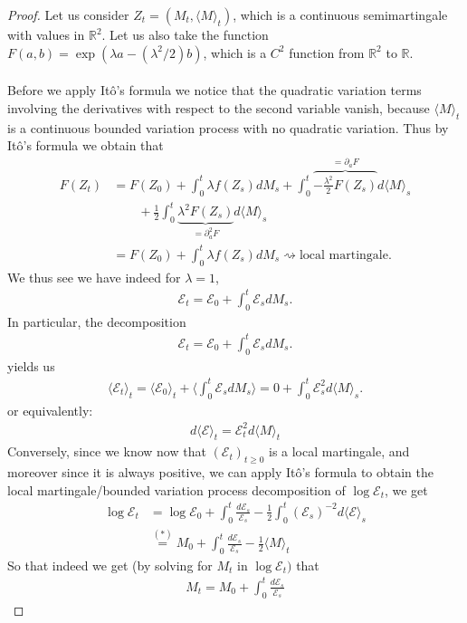 \documentclass[../mainfile.tex]{subfiles}
\begin{document}
\begin{proof}
Let us consider $Z_t= ( M_t, \langle M \rangle_t)$, which is a continuous semimartingale with values in $\mathbb{R}^2$. Let us also take the function $F(a,b)= \exp( \lambda a - (\lambda^2/2)b)$, which is a $C^2$ function from $\mathbb{R}^2$ to $ \mathbb{R}$.
\\
\\
Before we apply Itô's formula we notice that the quadratic variation terms involving the derivatives with respect to the second variable vanish, because $\langle M \rangle_t$ is a continuous bounded variation process with no quadratic variation. Thus by Itô's formula we obtain that
\begin{align*}
F(Z_t)&= F(Z_0) + \int_0^t \lambda f(Z_s)dM_s + \int_0^t \overbrace{- \frac{\lambda^2}{2}F(Z_s)}^{= \partial_a F}d \langle M \rangle _s \\
& \qquad + \frac{1}{2} \int_0^t  \underbrace{\lambda^2 F(Z_s)}_{= \partial^2_a F} d \langle M \rangle_s \\
&= F(Z_0) +  \int_0^t \lambda f(Z_s)dM_s \rightsquigarrow \text{local martingale}.
\end{align*}
We thus see we have indeed for $\lambda=1$,
\begin{align*}
\mathcal{E}_t= \mathcal{E}_0 + \int_0^t \mathcal{E}_s dM_s.
\end{align*}
\newpage
In particular, the decomposition 
\begin{align*}
\mathcal{E}_t= \mathcal{E}_0 + \int_0^t \mathcal{E}_s dM_s.
\end{align*}
yields us
\begin{align*}
\langle \mathcal{E}_t \rangle_t = \langle \mathcal{E}_0 \rangle_t + \langle \int_0^t \mathcal{E}_s d M_s \rangle = 0 + \int_0^t \mathcal{E}_s^2 d\langle M\rangle_s.
\end{align*}
or equivalently:
\begin{align*}
d \langle \mathcal{E} \rangle_t = \mathcal{E}_t^2 d\langle M\rangle_t \tag{*}
\end{align*}
Conversely, since we know now that $(\mathcal{E}_t)_{t \geq 0}$ is a local martingale, and moreover since it is always positive, we can apply Itô's formula to obtain the local martingale/bounded variation process decomposition of $\log \mathcal{E}_t$, we get
\begin{align*}
\log \mathcal{E}_t & =  \log \mathcal{E}_0 + \int_0^t \frac{d \mathcal{E}_s}{\mathcal{E}_s}- \frac{1}{2} \int_0^t ( \mathcal{E}_s)^{-2} d \langle \mathcal{E} \rangle_s  \\
& \overset{(*)}=  M_0 + \int_0^t \frac{d \mathcal{E}_s}{\mathcal{E}_s} - \frac{1}{2} \langle M \rangle_t
\end{align*}
So that indeed we get (by solving for $M_t$ in $\log \mathcal{E}_t)$ that
\begin{align*}
M_t = M_0 + \int_0^t \frac{d \mathcal{E}_s}{\mathcal{E}_s}
\end{align*}
\end{proof}
\end{document}
